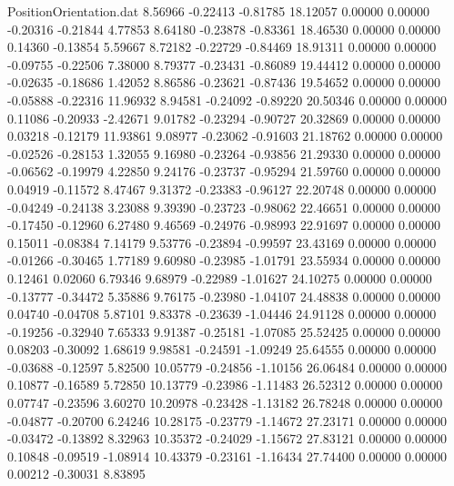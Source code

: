 \begin{filecontents}{PositionOrientation.dat}
   8.56966   -0.22413   -0.81785    18.12057    0.00000    0.00000   -0.20316   -0.21844    4.77853
   8.64180   -0.23878   -0.83361    18.46530    0.00000    0.00000    0.14360   -0.13854    5.59667
   8.72182   -0.22729   -0.84469    18.91311    0.00000    0.00000   -0.09755   -0.22506    7.38000
   8.79377   -0.23431   -0.86089    19.44412    0.00000    0.00000   -0.02635   -0.18686    1.42052
   8.86586   -0.23621   -0.87436    19.54652    0.00000    0.00000   -0.05888   -0.22316   11.96932
   8.94581   -0.24092   -0.89220    20.50346    0.00000    0.00000    0.11086   -0.20933   -2.42671
   9.01782   -0.23294   -0.90727    20.32869    0.00000    0.00000    0.03218   -0.12179   11.93861
   9.08977   -0.23062   -0.91603    21.18762    0.00000    0.00000   -0.02526   -0.28153    1.32055
   9.16980   -0.23264   -0.93856    21.29330    0.00000    0.00000   -0.06562   -0.19979    4.22850
   9.24176   -0.23737   -0.95294    21.59760    0.00000    0.00000    0.04919   -0.11572    8.47467
   9.31372   -0.23383   -0.96127    22.20748    0.00000    0.00000   -0.04249   -0.24138    3.23088
   9.39390   -0.23723   -0.98062    22.46651    0.00000    0.00000   -0.17450   -0.12960    6.27480
   9.46569   -0.24976   -0.98993    22.91697    0.00000    0.00000    0.15011   -0.08384    7.14179
   9.53776   -0.23894   -0.99597    23.43169    0.00000    0.00000   -0.01266   -0.30465    1.77189
   9.60980   -0.23985   -1.01791    23.55934    0.00000    0.00000    0.12461    0.02060    6.79346
   9.68979   -0.22989   -1.01627    24.10275    0.00000    0.00000   -0.13777   -0.34472    5.35886
   9.76175   -0.23980   -1.04107    24.48838    0.00000    0.00000    0.04740   -0.04708    5.87101
   9.83378   -0.23639   -1.04446    24.91128    0.00000    0.00000   -0.19256   -0.32940    7.65333
   9.91387   -0.25181   -1.07085    25.52425    0.00000    0.00000    0.08203   -0.30092    1.68619
   9.98581   -0.24591   -1.09249    25.64555    0.00000    0.00000   -0.03688   -0.12597    5.82500
  10.05779   -0.24856   -1.10156    26.06484    0.00000    0.00000    0.10877   -0.16589    5.72850
  10.13779   -0.23986   -1.11483    26.52312    0.00000    0.00000    0.07747   -0.23596    3.60270
  10.20978   -0.23428   -1.13182    26.78248    0.00000    0.00000   -0.04877   -0.20700    6.24246
  10.28175   -0.23779   -1.14672    27.23171    0.00000    0.00000   -0.03472   -0.13892    8.32963
  10.35372   -0.24029   -1.15672    27.83121    0.00000    0.00000    0.10848   -0.09519   -1.08914
  10.43379   -0.23161   -1.16434    27.74400    0.00000    0.00000    0.00212   -0.30031    8.83895

\end{filecontents}
